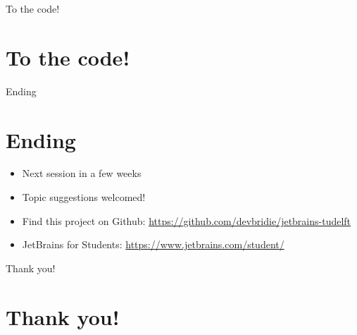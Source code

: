 \documentclass{beamer}
\begin{document}
\begin{frame}{To the code!}
\section{To the code!}
\end{frame}

\begin{frame}{Ending}
\section{Ending}
\begin{itemize}
    \item Next session in a few weeks
    \item Topic suggestions welcomed!
    \item Find this project on Github: \url{https://github.com/devbridie/jetbrains-tudelft}
    \item JetBrains for Students: \url{https://www.jetbrains.com/student/}
\end{itemize}
\end{frame}

\begin{frame}{Thank you!}
\section{Thank you!}
\end{frame}
\end{document}
